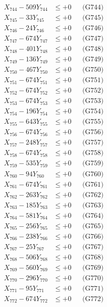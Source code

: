 \documentclass[a4paper,10pt]{article}
\begin{document}
{\begin{align}
X_{744} - 509Y_{744} &\leq +0 && \text{(G744)} \\
X_{745} - 33Y_{745} &\leq +0 && \text{(G745)} \\
X_{746} - 24Y_{746} &\leq +0 && \text{(G746)} \\
X_{747} - 674Y_{747} &\leq +0 && \text{(G747)} \\
X_{748} - 401Y_{748} &\leq +0 && \text{(G748)} \\
X_{749} - 136Y_{749} &\leq +0 && \text{(G749)} \\
X_{750} - 467Y_{750} &\leq +0 && \text{(G750)} \\
\allowbreak
X_{751} - 674Y_{751} &\leq +0 && \text{(G751)} \\
X_{752} - 674Y_{752} &\leq +0 && \text{(G752)} \\
X_{753} - 674Y_{753} &\leq +0 && \text{(G753)} \\
X_{754} - 196Y_{754} &\leq +0 && \text{(G754)} \\
X_{755} - 643Y_{755} &\leq +0 && \text{(G755)} \\
X_{756} - 674Y_{756} &\leq +0 && \text{(G756)} \\
X_{757} - 248Y_{757} &\leq +0 && \text{(G757)} \\
X_{758} - 674Y_{758} &\leq +0 && \text{(G758)} \\
X_{759} - 535Y_{759} &\leq +0 && \text{(G759)} \\
X_{760} - 94Y_{760} &\leq +0 && \text{(G760)} \\
\allowbreak
X_{761} - 674Y_{761} &\leq +0 && \text{(G761)} \\
X_{762} - 263Y_{762} &\leq +0 && \text{(G762)} \\
X_{763} - 185Y_{763} &\leq +0 && \text{(G763)} \\
X_{764} - 581Y_{764} &\leq +0 && \text{(G764)} \\
X_{765} - 256Y_{765} &\leq +0 && \text{(G765)} \\
X_{766} - 238Y_{766} &\leq +0 && \text{(G766)} \\
X_{767} - 25Y_{767} &\leq +0 && \text{(G767)} \\
X_{768} - 506Y_{768} &\leq +0 && \text{(G768)} \\
X_{769} - 560Y_{769} &\leq +0 && \text{(G769)} \\
X_{770} - 296Y_{770} &\leq +0 && \text{(G770)} \\
\allowbreak
X_{771} - 95Y_{771} &\leq +0 && \text{(G771)} \\
X_{772} - 674Y_{772} &\leq +0 && \text{(G772)} \\

\end{align}}
\end{document}
